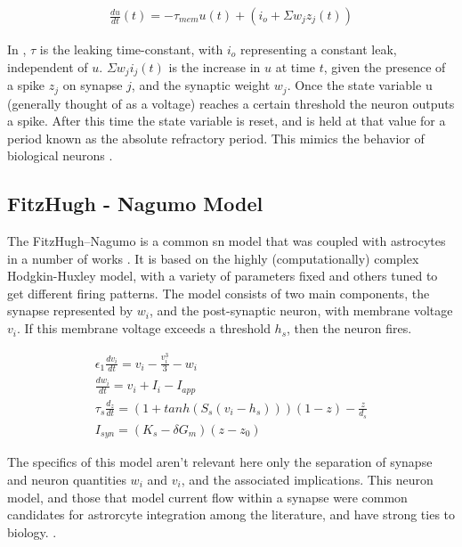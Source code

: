     \begin{align}
        \frac{du}{dt}(t) = -\tau_{mem}u(t)+(i_o + \Sigma w_jz_j(t)) \label{eq:lif}
    \end{align}
    
    In , $\tau$ is the leaking time-constant, with $i_o$
    representing a constant leak, independent of $u$. $\Sigma w_ji_j(t)$ is the
    increase in $u$ at time $t$, given the presence of a spike $z_j$ on synapse
    $j$, and the synaptic weight $w_j$. Once the state variable u (generally
    thought of as a voltage) reaches a certain threshold the neuron outputs a
    spike. After this time the state variable is reset, and is held at that
    value for a period known as the absolute refractory period. This mimics the
    behavior of biological neurons \parencite{ponulak_2011}.



    \subsection{FitzHugh - Nagumo Model}
    The FitzHugh–Nagumo is a common \gls{sn} model that was coupled with
    astrocytes in a number of works \parencite{postnov_2009, postnov_2007}. It
    is based on the highly (computationally) complex Hodgkin-Huxley model, with
    a variety of parameters fixed and others tuned to get different firing
    patterns. The model consists of two main components, the synapse represented
    by $w_i$, and the post-synaptic neuron, with membrane voltage $v_i$. If this
    membrane voltage exceeds a threshold $h_s$, then the neuron fires. 

    \begin{align}
      \epsilon_1 \frac{dv_i}{dt} = v_i - \frac{v_i^3}{3} -
      w_i \label{eq:fn_neuron}  \\
      \frac{dw_i}{dt} = v_i + I_i - I_{app} \\
      \tau_s \frac{d_z}{dt} = (1 + tanh(S_s(v_i - h_s)))(1 - z) - \frac{z}{d_s} \label{eq:fitz_nn}
      \\
      I_{syn} = (K_s - \delta G_m)(z - z_0)
    \end{align}

    The specifics of this model aren't relevant here only the separation of
    synapse and neuron quantities $w_i$ and $v_i$, and the associated
    implications. This neuron model, and those that model current flow within a
    synapse were common candidates for astrorcyte integration among the
    literature, and have strong ties to biology. \parencite{wade_2011,
      pitta_2016, postnov_2009}.
    
